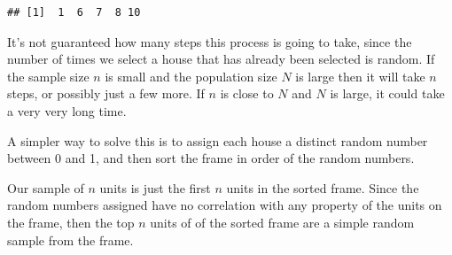 \documentclass[
]{book}
\newenvironment{Shaded}{\begin{snugshade}}{\end{snugshade}}
\newcommand{\AttributeTok}[1]{\textcolor[rgb]{0.13,0.29,0.53}{#1}}
\newcommand{\CommentTok}[1]{\textcolor[rgb]{0.56,0.35,0.01}{\textit{#1}}}
\newcommand{\ConstantTok}[1]{\textcolor[rgb]{0.56,0.35,0.01}{#1}}
\newcommand{\ControlFlowTok}[1]{\textcolor[rgb]{0.13,0.29,0.53}{\textbf{#1}}}
\newcommand{\DecValTok}[1]{\textcolor[rgb]{0.00,0.00,0.81}{#1}}
\newcommand{\FunctionTok}[1]{\textcolor[rgb]{0.13,0.29,0.53}{\textbf{#1}}}
\newcommand{\NormalTok}[1]{#1}
\newcommand{\OtherTok}[1]{\textcolor[rgb]{0.56,0.35,0.01}{#1}}
\newcommand{\SpecialCharTok}[1]{\textcolor[rgb]{0.81,0.36,0.00}{\textbf{#1}}}
\begin{document}
\begin{Shaded}
\end{Shaded}

\begin{verbatim}
## [1]  1  6  7  8 10
\end{verbatim}

It's not guaranteed how many steps this process is going to take, since the number
of times we select a house that has already been selected is random. If the sample size
\(n\) is small and the population size \(N\) is large then it will take \(n\) steps, or possibly
just a few more. If \(n\) is close to \(N\) and \(N\) is large, it could take a very very
long time.

A simpler way to solve this is to assign each house a distinct random number
between 0 and 1, and then sort the frame in order of the random numbers.

Our sample of \(n\) units is just the first \(n\) units in the sorted frame.
Since the random numbers assigned have no correlation with any property of the
units on the frame, then the top \(n\) units of of the sorted frame are a
simple random sample from the frame.
\end{document}
